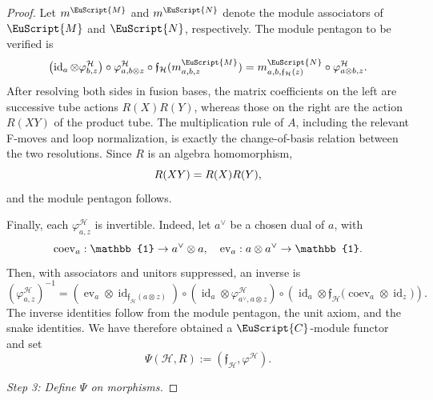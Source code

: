 \documentclass[a4paper,11pt]{article}
\theoremstyle{definition}
\theoremstyle{remark}
\newcommand\eC           {\EuScript{C}}
\newcommand\eM          {\EuScript{M}}
\newcommand\eN         {\EuScript{N}}
\newcommand{\id}{\operatorname{id}}
\begin{document}
\begin{proof}
Let $m^{\eM}$ and $m^{\eN}$ denote the module associators of $\eM$ and $\eN$, respectively. The module pentagon to be verified is
\begin{equation}
    \notag
        \bigl(\id_a
            \otimes
            \varphi^{\mathcal H}_{b,z}
        \bigr)
        \circ
        \varphi^{\mathcal H}_{a,b\otimes z}
        \circ
        \mathfrak{f}_{\mathcal H}(m^{\eM}_{a,b,z}) =
        m^{\eN}_{a,b,\mathfrak{f}_{\mathcal H}(z)}
        \circ
        \varphi^{\mathcal H}_{a\otimes b,z}.
\end{equation}
After resolving both sides in fusion bases, the matrix coefficients on the left are successive tube actions $R(X)R(Y)$, whereas those on the right are the action $R(XY)$ of the product tube.  The multiplication rule of $A$, including the relevant F-moves and loop normalization, is exactly the change-of-basis relation between the two resolutions. Since $R$ is an algebra homomorphism,
\begin{equation}
    \notag
    R(XY)=R(X)R(Y),
\end{equation}
and the module pentagon follows.

Finally, each $\varphi^{\mathcal H}_{a,z}$ is invertible. Indeed, let $a^{\vee}$ be a chosen dual of $a$, with
\begin{equation}
    \notag 
    \operatorname{coev}_a:
    \mathbb{1}\to  a^{\vee}\otimes a,
    \quad
    \operatorname{ev}_a:
    a\otimes a^{\vee}\to \mathbb{1}.
\end{equation}
Then, with associators and unitors suppressed, an inverse is
\begin{equation*}
        \left(\varphi^{\mathcal H}_{a,z}\right)^{-1} = \left(\operatorname{ev}_a\otimes\id_{\mathfrak{f}_{\mathcal H}(a\otimes z)}\right)\circ\left(\id_a\otimes\varphi^{\mathcal H}_{a^{\vee},a\otimes z} \right)\circ\left(\id_a\otimes\mathfrak{f}_{\mathcal H} \bigl(\operatorname{coev}_a \otimes \id_z\bigr)\right).
\end{equation*}
The inverse identities follow from the module pentagon, the unit axiom, and the snake identities.  We have therefore obtained a $\eC$-module functor and set
\begin{equation*}
    \Psi(\mathcal H,R):=(\mathfrak{f}_{\mathcal H},\varphi^{\mathcal H}).
\end{equation*}

\smallskip
\textit{Step 3: Define $\Psi$ on morphisms.}


\end{proof}
\end{document}
